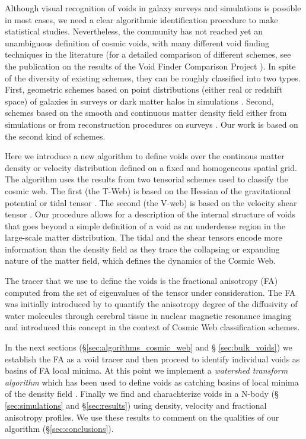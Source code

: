 \documentclass[a4,useAMS,usenatbib,usegraphicx]{mn2e}
\begin{document}
Although visual recognition of voids in galaxy surveys and simulations
is possible in most cases, we need a clear algorithmic identification
procedure to make statistical studies.
Nevertheless, the community has not reached yet an unambiguous
definition of cosmic voids, with many different void finding
techniques in the literature  (for a detailed comparison of different
schemes,  see the publication on the results of the Void Finder
Comparison Project \citet{Colberg08}).  
In spite of the diversity of existing schemes, they can be roughly
classified into two types. First, geometric schemes based on
point distributions (either real or redshift space) of galaxies in
surveys or dark matter halos in  simulations \citep{Kauffmann91, Muller00, 
  Gottlober03, Hoyle04, Brunino07,  Foster09, Micheletti14, Sutter14}.
Second, schemes based on the smooth and continuous matter density
field either from simulations or from reconstruction procedures on
surveys \citep{Plionis02, Colberg05,  Shandarin06, Platen07,
  Neyrinck08, MunozCuartas11, Neyrinck13, Ricciardelli2013}. 
Our work is based on the second kind of schemes. 


Here we introduce a new algorithm to define voids over the continous
matter density or velocity distribution defined on a fixed and
homogeneous spatial grid.
The algorithm uses the results from two tensorial schemes used to
classify the cosmic web.
The first (the T-Web) is based on the Hessian of the gravitational potential or
tidal tensor \citep{Hahn07, Forero09}. 
The second (the V-web) is based on the velocity shear tensor
\citep{Hoffman12}. 
Our procedure allows for a description of the internal structure
of voids that goes beyond a simple definition of a void as an
underdense region in the large-scale matter distribution.
The tidal and the shear tensors encode more information than the
density field as they trace the collapsing or expanding
nature of the matter field, which defines the dynamics of the Cosmic
Web. 

The tracer that we use to define the voids is the fractional
anisotropy (FA) computed from the set of eigenvalues of the tensor
under consideration. 
The FA was initially introduced by \citet{Basser95} to quantify the
anisotropy degree of the diffusivity of water molecules through
cerebral tissue in nuclear magnetic resonance
imaging and \citet{Libeskind13} introduced this concept in the context
of Cosmic Web classification schemes. 

In the next sections (\S \ref{sec:algorithms_cosmic_web} and \S
\ref{sec:bulk_voids}) we establish the FA as a void tracer and then
proceed to identify individual voids as basins of FA local minima.  At
this point we implement a \textit{watershed transform algorithm}
\citep{Beucher79,Beucher93} which has been used to define voids as
catching basins of local minima of the density field \citep{Platen07,Neyrinck08}.
Finally we find and charachterize voids in a N-body (\S
\ref{sec:simulations} and \S \ref{sec:results}) using density, velocity and
fractional anisotropy profiles.  We use these results to comment on
the qualities of our algorithm (\S \ref{sec:conclusions}).  
\end{document}

